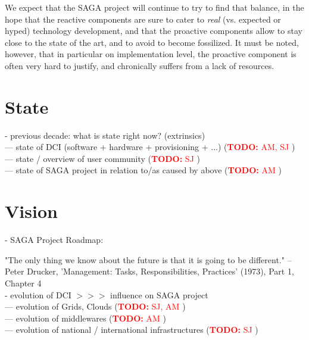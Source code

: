 \documentclass{article}
\newcommand{\I}[1]{\textit{#1}}
\newcommand{\B}[1]{\textbf{#1}}
\newcommand{\nind}{\noindent}
\newcommand{\todo}[1]{{\textcolor{red}{\B{TODO:} #1 }}}
\begin{document}
  We expect that the SAGA project will continue to try to find that
  balance, in the hope that the reactive components are sure to cater
  to \I{real} (vs. expected or hyped) technology development, and that
  the proactive components allow to stay close to the state of the
  art, and to avoid to become fossilized.  It must be noted, however,
  that in particular on implementation level, the proactive component
  is often very hard to justify, and chronically suffers from a lack
  of resources.


\section{State}

 \nind
 - previous decade: what is state right now? (extrinsics)\\
 --- state of DCI (software + hardware + provisioning + ...) (\todo{AM, SJ})\\
 --- state / overview of user community (\todo{SJ})\\
 --- state of SAGA project in relation to/as caused by above (\todo{AM})


\section{Vision}

 \nind
 - SAGA Project Roadmap:\\

 
 \nind

 "The only thing we know about the future is that it is going to be
 different." -- Peter Drucker, 'Management: Tasks,
 Responsibilities, Practices' (1973), Part 1, Chapter 4\\ 


 - evolution of DCI $>>>$ influence on SAGA project\\
 --- evolution of Grids, Clouds (\todo{SJ, AM})\\
 --- evolution of middlewares (\todo{AM})\\
 --- evolution of national / international infrastructures (\todo{SJ})\\
 
\end{document}
